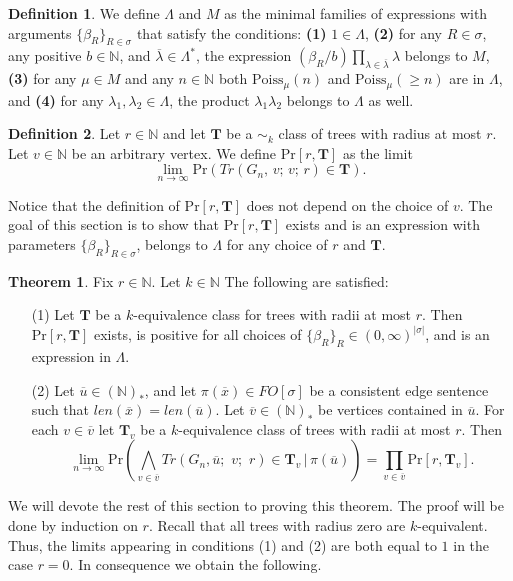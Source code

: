 \documentclass[12pt,notitlepage,a4paper]{article}
\theoremstyle{definition}
\newtheorem{theorem}{Theorem}[section]
\newtheorem{definition}{Definition}[section]
\newcommand{\N}{\mathbb{N}}
\newcommand{\Ln}{\lim\limits_{n\to \infty}}
\begin{document}
\begin{definition} \label{def:treeprobabilies}
We define $\Lambda$ and $M$ as the minimal families
of expressions with arguments $\{\beta_R\}_{R\in\sigma}$
that satisfy the conditions: \textbf{(1)}
$1\in \Lambda$, \textbf{(2)} 
for any $R\in \sigma$, any positive $b\in \N$,
and $\overline{\lambda} \in \Lambda^*$,
the expression $(\beta_R/b) \prod_{\lambda\in \overline{\lambda}}
\lambda$
belongs to $M$, \textbf{(3)}
for any $\mu\in M$ and any $n\in \N$ both
$\mathrm{Poiss}_{\mu}(n)$ and $\mathrm{Poiss}_\mu(\geq n)$ are in $\Lambda$, 
and  \textbf{(4)} for any $\lambda_1,\lambda_2 \in \Lambda$, the
product $\lambda_1\lambda_2$ belongs to $\Lambda$ as well.
\end{definition}


\begin{definition}
	Let $r\in \N$ and let $\mathbf{T}$ be a $\sim_k$ class
	of trees with radius at most $r$. Let $v\in \N$ be an arbitrary 
	vertex. We define $\mathrm{Pr}[r,\mathbf{T}]$ as the limit
	\[
	\Ln \mathrm{Pr}\left(
	Tr(G_n,\,v;\,v;\,r)\in \mathbf{T}\right).
	\]
\end{definition}

Notice that the 
definition of  $\mathrm{Pr}[r,\mathbf{T}]$ does not depend on the
choice of $v$. The goal of this section is to show 
that $\mathrm{Pr}[r,\mathbf{T}]$ exists and is
an expression with parameters
$\{\beta_R\}_{R\in\sigma}$, belongs to $\Lambda$ 
for any choice of $r$ and $\mathbf{T}$. \par




\begin{theorem} \label{thm:BigTrees}
	Fix $r\in \N$. Let $k\in \N$ The following are satisfied:
	\begin{itemize}
		\item[(1)] Let $\mathbf{T}$ be a
		$k$-equivalence class for trees with radii at most $r$.	Then 
		$
		\mathrm{Pr}[r,\mathbf{T}]
		$
		exists,
		is positive for all choices of 
		$\{\beta_R\}_{R}\in (0,\infty)^{|\sigma|}$,
		and is an expression
		in $\Lambda$.
		\item[(2)] Let $\overline{u}\in (\N)_*$,
		and let $\pi(\overline{x})\in FO[\sigma]$ be a consistent
		edge sentence such that 
		$len(\overline{x})=len(\overline{u})$.
		Let $\overline{v}\in (\N)_*$ be vertices contained
		in $\overline{u}$. For each $v\in \overline{v}$
		let $\mathbf{T}_v$ be a $k$-equivalence class
		of trees with radii	at most $r$. Then
		\[
		\Ln \mathrm{Pr}\left( \bigwedge_{v\in \overline{v}} 
		Tr\left(G_n, \overline{u};\,\,v;\,\,r\right)\in \mathbf{T}_v 
		\, | \, \pi(\overline{u})
		\right)= \prod_{v\in \overline{v}} \mathrm{Pr}[r,\mathbf{T}_v]. \]	 	
	\end{itemize}
\end{theorem}
We will devote the rest of this section to proving this
theorem. The proof will be done by induction on $r$. 
Recall that	all trees with radius zero are $k$-equivalent. Thus,
the limits appearing in conditions (1) and (2) are both equal to $1$
in the case $r=0$. In consequence we obtain the following. 
\end{document}

